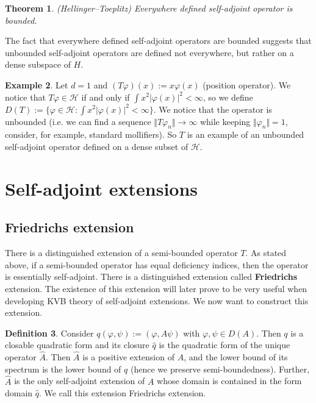 \documentclass[11pt, a4paper, german]{article}
\theoremstyle{plain}
\newtheorem{theorem}{Theorem}
\theoremstyle{definition}
\newtheorem{definition}[theorem]{Definition}
\newtheorem{example}[theorem]{Example}
\theoremstyle{remark}
\numberwithin{equation}{section}
\numberwithin{theorem}{section}
\begin{document}
\begin{theorem} (Hellinger--Toeplitz)
Everywhere defined self-adjoint operator is bounded.
\end{theorem}

The fact that everywhere defined self-adjoint operators are bounded suggests that unbounded self-adjoint operators are defined not everywhere, but rather on a dense subspace of $H$.

\begin{example}

Let $d=1$ and $(T \varphi)(x) := x \varphi (x)$ (position operator). We notice that $T \varphi \in \mathcal{H}$ if and only if $\int x^2 |\varphi(x)|^2 < \infty$, so we define $D(T):= \{\varphi \in \mathcal{H} :\int x^2 |\varphi(x)|^2 < \infty \}$. We notice that the operator is unbounded (i.e. we can find a sequence $\Vert T \varphi_n \Vert \rightarrow \infty$ while keeping $\Vert \varphi_n \Vert = 1$, consider, for example, standard mollifiers). So $T$ is an example of an unbounded self-adjoint operator defined on a dense subset of $\mathcal{H}$.

\end{example}

\section{Self-adjoint extensions}\label{sec:self-adjoint-extensions}

\subsection{Friedrichs extension}

There is a distinguished extension of a semi-bounded operator $T$. As stated above, if a semi-bounded operator has equal deficiency indices, then the operator is essentially self-adjoint. There is a distinguished extension called \textbf{Friedrichs} extension. The existence of this extension will later prove to be very useful when developing KVB theory of self-adjoint extensions. We now want to construct this extension.

\begin{definition}
Consider $q(\varphi, \psi) := (\varphi, A\psi)$ with $\varphi, \psi \in D(A)$. Then $q$ is a closable quadratic form and its closure $\hat{q}$ is the quadratic form of the unique operator $\hat{A}$. Then $\hat{A}$ is a positive extension of $A$, and the lower bound of its spectrum is the lower bound of $q$ (hence we preserve semi-boundedness). Further, $\hat{A}$ is the only self-adjoint extension of $A$ whose domain is contained in the form domain $\hat{q}$. We call this extension Friedrichs extension.
\end{definition}
\end{document}
